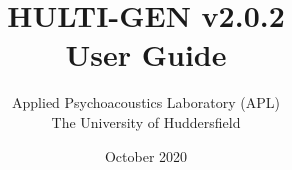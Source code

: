 \documentclass[oneside, a4paper,12pt]{book}
\begin{document}
\author{Applied Psychoacoustics Laboratory (APL) \\ The University of Huddersfield}
\title{HULTI-GEN v2.0.2 \\ User Guide}
\date{October 2020}

\maketitle
\cleardoublepage
\tableofcontents






\appendix


\end{document}
